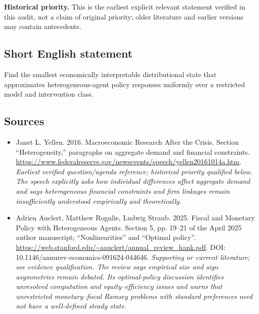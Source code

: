 \documentclass[11pt]{article}
\begin{document}
\par\textbf{Historical priority.} This is the earliest explicit relevant statement verified in this audit, not a claim of original priority; older literature and earlier versions may contain antecedents.

\subsection{Short English statement}
Find the smallest economically interpretable distributional state that approximates heterogeneous-agent policy responses uniformly over a restricted model and intervention class.

\subsection{Sources}
\begin{itemize}\raggedright
\item[\textnormal{[S1]}]\hypertarget{source:30007515:1}{} Janet L. Yellen. 2016. Macroeconomic Research After the Crisis. Section “Heterogeneity,” paragraphs on aggregate demand and financial constraints.
\url{https://www.federalreserve.gov/newsevents/speech/yellen20161014a.htm}.
{\small\textit{Earliest verified question/agenda reference; historical priority qualified below. The speech explicitly asks how individual differences affect aggregate demand and says heterogeneous financial constraints and firm linkages remain insufficiently understood empirically and theoretically.}}

\item[\textnormal{[S2]}]\hypertarget{source:30007515:2}{} Adrien Auclert, Matthew Rognlie, Ludwig Straub. 2025. Fiscal and Monetary Policy with Heterogeneous Agents. Section 5, pp. 19–21 of the April 2025 author manuscript; “Nonlinearities” and “Optimal policy”.
\url{https://web.stanford.edu/~aauclert/annual_review_hank.pdf}.
DOI: 10.1146/annurev-economics-091624-044646.
{\small\textit{Supporting or current literature; see evidence qualification. The review says empirical size and sign asymmetries remain debated. Its optimal-policy discussion identifies unresolved computation and equity–efficiency issues and warns that unrestricted monetary–fiscal Ramsey problems with standard preferences need not have a well-defined steady state.}}
\end{itemize}
\end{document}
